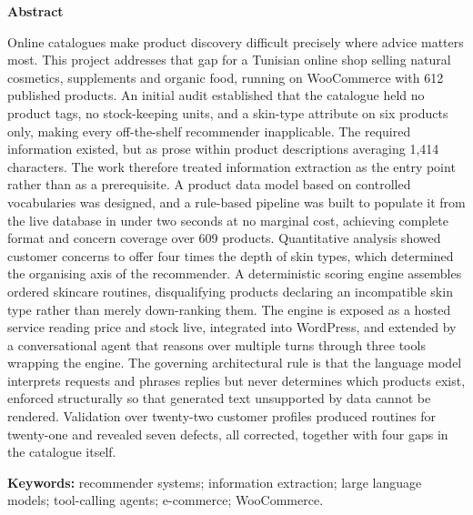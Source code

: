 ﻿%
\clearpage
\thispagestyle{empty}
{}

\begin{center}
  {\Large\bfseries Abstract}
\end{center}
\vspace{0.6cm}

Online catalogues make product discovery difficult precisely where advice
matters most. This project addresses that gap for a Tunisian online shop selling
natural cosmetics, supplements and organic food, running on WooCommerce with 612
published products. An initial audit established that the catalogue held no
product tags, no stock-keeping units, and a skin-type attribute on six products
only, making every off-the-shelf recommender inapplicable. The required
information existed, but as prose within product descriptions averaging 1{,}414
characters. The work therefore treated information extraction as the entry point
rather than as a prerequisite. A product data model based on controlled
vocabularies was designed, and a rule-based pipeline was built to populate it
from the live database in under two seconds at no marginal cost, achieving
complete format and concern coverage over 609 products. Quantitative analysis
showed customer concerns to offer four times the depth of skin types, which
determined the organising axis of the recommender. A deterministic scoring engine
assembles ordered skincare routines, disqualifying products declaring an
incompatible skin type rather than merely down-ranking them. The engine is
exposed as a hosted service reading price and stock live, integrated into
WordPress, and extended by a conversational agent that reasons over multiple
turns through three tools wrapping the engine. The governing architectural rule
is that the language model interprets requests and phrases replies but never
determines which products exist, enforced structurally so that generated text
unsupported by data cannot be rendered. Validation over twenty-two customer
profiles produced routines for twenty-one and revealed seven defects, all
corrected, together with four gaps in the catalogue itself.

\vspace{0.8cm}
\noindent\textbf{Keywords:} recommender systems; information extraction;
large language models; tool-calling agents; e-commerce; WooCommerce.

\vspace{1.4cm}

